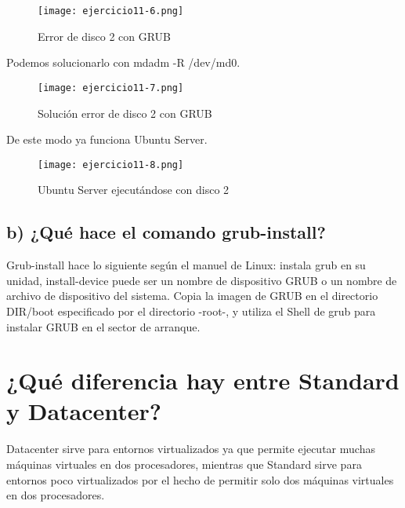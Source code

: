	\begin{figure}[H]
		\centering
		\texttt{[image: ejercicio11-6.png]} 
		\label{figura15} 		
		\caption{Error de disco 2 con GRUB} 
	\end{figure}
	
	Podemos solucionarlo con mdadm -R /dev/md0\cite{cuarentayocho}.
	
	\begin{figure}[H]
		\centering
		\texttt{[image: ejercicio11-7.png]} 
		\label{figura16} 		
		\caption{Solución error de disco 2 con GRUB} 
	\end{figure}
	
	De este modo ya funciona Ubuntu Server.
	
	\begin{figure}[H]
		\centering
		\texttt{[image: ejercicio11-8.png]} 
		\label{figura17} 		
		\caption{Ubuntu Server ejecutándose con disco 2} 
	\end{figure}
	
	\subsection{b) ¿Qué hace el comando grub-install?}
	
	Grub-install\cite{cuarentayseis}  hace lo siguiente según el manuel de Linux: instala grub en su unidad, install-device puede ser un nombre de dispositivo GRUB o un nombre de archivo de dispositivo del sistema. Copia la imagen de GRUB en el directorio DIR/boot especificado por el directorio -root-, y utiliza el Shell de grub para instalar GRUB en el sector de arranque.
	
	
	
	
	
	
	\section{¿Qué diferencia hay entre Standard y Datacenter?}
	
	Datacenter\cite{cuarentaynueve}  sirve para entornos virtualizados ya que permite ejecutar muchas máquinas virtuales en dos procesadores, mientras que Standard sirve para entornos poco virtualizados por el hecho de permitir solo dos máquinas virtuales en dos procesadores.
